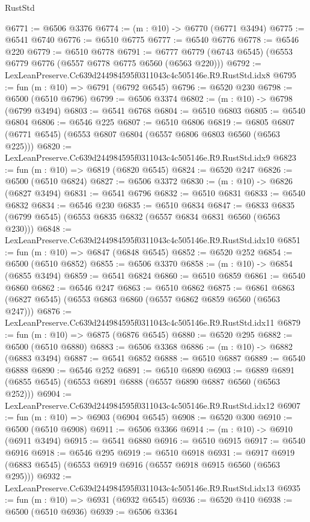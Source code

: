 \begin{lexlean}{RustStd}
\begin{coremodule}
@6771 := @6506 @3376
@6774 := (m : @10) -> @6770 (@6771 @3494)
@6775 := @6541 @6740
@6776 := @6510 @6775
@6777 := @6540 @6776
@6778 := @6546 @220
@6779 := @6510 @6778
@6791 := @6777 @6779 (@6743 @6545) (@6553 @6779 @6776 (@6557 @6778 @6775 @6560 (@6563 @220)))
@6792 := LexLeanPreserve.Cc639d244984595f0311043c4c505146e.R9.RustStd.idx8
@6795 := fun (m : @10) => @6791 (@6792 @6545)
@6796 := @6520 @230
@6798 := @6500 (@6510 @6796)
@6799 := @6506 @3374
@6802 := (m : @10) -> @6798 (@6799 @3494)
@6803 := @6541 @6768
@6804 := @6510 @6803
@6805 := @6540 @6804
@6806 := @6546 @225
@6807 := @6510 @6806
@6819 := @6805 @6807 (@6771 @6545) (@6553 @6807 @6804 (@6557 @6806 @6803 @6560 (@6563 @225)))
@6820 := LexLeanPreserve.Cc639d244984595f0311043c4c505146e.R9.RustStd.idx9
@6823 := fun (m : @10) => @6819 (@6820 @6545)
@6824 := @6520 @247
@6826 := @6500 (@6510 @6824)
@6827 := @6506 @3372
@6830 := (m : @10) -> @6826 (@6827 @3494)
@6831 := @6541 @6796
@6832 := @6510 @6831
@6833 := @6540 @6832
@6834 := @6546 @230
@6835 := @6510 @6834
@6847 := @6833 @6835 (@6799 @6545) (@6553 @6835 @6832 (@6557 @6834 @6831 @6560 (@6563 @230)))
@6848 := LexLeanPreserve.Cc639d244984595f0311043c4c505146e.R9.RustStd.idx10
@6851 := fun (m : @10) => @6847 (@6848 @6545)
@6852 := @6520 @252
@6854 := @6500 (@6510 @6852)
@6855 := @6506 @3370
@6858 := (m : @10) -> @6854 (@6855 @3494)
@6859 := @6541 @6824
@6860 := @6510 @6859
@6861 := @6540 @6860
@6862 := @6546 @247
@6863 := @6510 @6862
@6875 := @6861 @6863 (@6827 @6545) (@6553 @6863 @6860 (@6557 @6862 @6859 @6560 (@6563 @247)))
@6876 := LexLeanPreserve.Cc639d244984595f0311043c4c505146e.R9.RustStd.idx11
@6879 := fun (m : @10) => @6875 (@6876 @6545)
@6880 := @6520 @295
@6882 := @6500 (@6510 @6880)
@6883 := @6506 @3368
@6886 := (m : @10) -> @6882 (@6883 @3494)
@6887 := @6541 @6852
@6888 := @6510 @6887
@6889 := @6540 @6888
@6890 := @6546 @252
@6891 := @6510 @6890
@6903 := @6889 @6891 (@6855 @6545) (@6553 @6891 @6888 (@6557 @6890 @6887 @6560 (@6563 @252)))
@6904 := LexLeanPreserve.Cc639d244984595f0311043c4c505146e.R9.RustStd.idx12
@6907 := fun (m : @10) => @6903 (@6904 @6545)
@6908 := @6520 @300
@6910 := @6500 (@6510 @6908)
@6911 := @6506 @3366
@6914 := (m : @10) -> @6910 (@6911 @3494)
@6915 := @6541 @6880
@6916 := @6510 @6915
@6917 := @6540 @6916
@6918 := @6546 @295
@6919 := @6510 @6918
@6931 := @6917 @6919 (@6883 @6545) (@6553 @6919 @6916 (@6557 @6918 @6915 @6560 (@6563 @295)))
@6932 := LexLeanPreserve.Cc639d244984595f0311043c4c505146e.R9.RustStd.idx13
@6935 := fun (m : @10) => @6931 (@6932 @6545)
@6936 := @6520 @410
@6938 := @6500 (@6510 @6936)
@6939 := @6506 @3364

\end{coremodule}
\end{lexlean}

